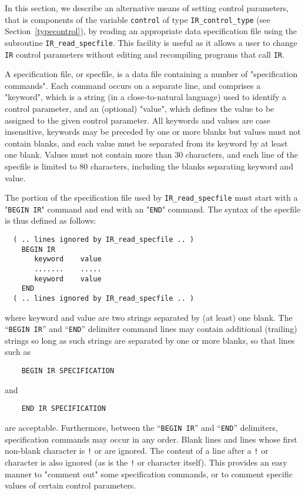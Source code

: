 \documentclass{galahad}
\newcommand{\packagename}{IR}
\begin{document}

\galfeatures
\noindent In this section, we describe an alternative means of setting
control parameters, that is components of the variable {\tt control} of type
{\tt \packagename\_control\_type}
(see Section~\ref{typecontrol}),
by reading an appropriate data specification file using the
subroutine {\tt \packagename\_read\_specfile}. This facility
is useful as it allows a user to change  {\tt \packagename} control parameters
without editing and recompiling programs that call {\tt \packagename}.

A specification file, or specfile, is a data file containing a number of
"specification commands". Each command occurs on a separate line,
and comprises a "keyword",
which is a string (in a close-to-natural language) used to identify a
control parameter, and
an (optional) "value", which defines the value to be assigned to the given
control parameter. All keywords and values are case insensitive,
keywords may be preceded by one or more blanks but
values must not contain blanks, and
each value must be separated from its keyword by at least one blank.
Values must not contain more than 30 characters, and
each line of the specfile is limited to 80 characters,
including the blanks separating keyword and value.

The portion of the specification file used by
{\tt \packagename\_read\_specfile}
must start
with a "{\tt BEGIN \packagename}" command and end with an
"{\tt END}" command.  The syntax of the specfile is thus defined as follows:
\begin{verbatim}
  ( .. lines ignored by IR_read_specfile .. )
    BEGIN IR
       keyword    value
       .......    .....
       keyword    value
    END
  ( .. lines ignored by IR_read_specfile .. )
\end{verbatim}
where keyword and value are two strings separated by (at least) one blank.
The ``{\tt BEGIN \packagename}'' and ``{\tt END}'' delimiter command lines
may contain additional (trailing) strings so long as such strings are
separated by one or more blanks, so that lines such as
\begin{verbatim}
    BEGIN IR SPECIFICATION
\end{verbatim}
and
\begin{verbatim}
    END IR SPECIFICATION
\end{verbatim}
are acceptable. Furthermore,
between the
``{\tt BEGIN \packagename}'' and ``{\tt END}'' delimiters,
specification commands may occur in any order.  Blank lines and
lines whose first non-blank character is {\tt !} or {\tt *} are ignored.
The content
of a line after a {\tt !} or {\tt *} character is also
ignored (as is the {\tt !} or {\tt *}
character itself). This provides an easy manner to "comment out" some
specification commands, or to comment specific values
of certain control parameters.
\end{document}
